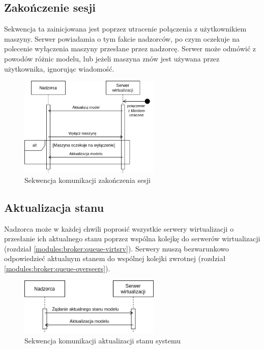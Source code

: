 \documentclass[../opis-rozwiazania.tex]{subfiles}
\begin{document}
\subsection{Zakończenie sesji}

Sekwencja ta zainicjowana jest poprzez utracenie połączenia z użytkownikiem maszyny.
Serwer powiadamia o tym fakcie nadzorców, po czym oczekuje na polecenie wyłączenia maszyny przesłane przez nadzorcę. Serwer może odmówić z powodów różnic modelu, lub jeżeli maszyna znów jest używana przez użytkownika, ignorując wiadomość.

\begin{figure}[H]
    \centering
    \includegraphics[width=0.6\textwidth]{../diagrams/sequence_diagrams/konczenie_sesji.png}
    \caption{Sekwencja komunikacji zakończenia sesji}
    \label{figure:diagrams:sequence_diagrams:konczenie_sesji}
\end{figure}

\subsection{Aktualizacja stanu}

Nadzorca może w każdej chwili poprosić wszystkie serwery wirtualizacji
o przesłanie ich aktualnego stanu poprzez wspólna kolejkę do serwerów wirtualizacji (rozdział \ref{modules:broker:queue-virtsrv}).
Serwery muszą bezwarunkowo odpowiedzieć aktualnym stanem do wspólnej kolejki zwrotnej (rozdział \ref{modules:broker:queue-overseers}).

\begin{figure}[H]
    \centering
    \includegraphics[width=0.6\textwidth]{../diagrams/sequence_diagrams/aktualizacja_stanu.png}
    \caption{Sekwencja komunikacji aktualizacji stanu systemu}
    \label{figure:diagrams:sequence_diagrams:aktualizacja_stanu}
\end{figure}
\end{document}
